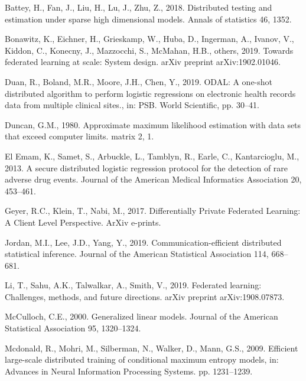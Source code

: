 \documentclass[]{elsarticle} %
\newlength{\cslhangindent}
\newenvironment{cslreferences}%
  {\setlength{\parindent}{0pt}%
  \everypar{\setlength{\hangindent}{\cslhangindent}}\ignorespaces}%
  {\par}
\begin{document}
\hypertarget{refs}{}
\begin{cslreferences}
\leavevmode\hypertarget{ref-battey2018distributed}{}%
Battey, H., Fan, J., Liu, H., Lu, J., Zhu, Z., 2018. Distributed testing
and estimation under sparse high dimensional models. Annals of
statistics 46, 1352.

\leavevmode\hypertarget{ref-bonawitz2019towards}{}%
Bonawitz, K., Eichner, H., Grieskamp, W., Huba, D., Ingerman, A.,
Ivanov, V., Kiddon, C., Konecny, J., Mazzocchi, S., McMahan, H.B.,
others, 2019. Towards federated learning at scale: System design. arXiv
preprint arXiv:1902.01046.

\leavevmode\hypertarget{ref-duan2019odal}{}%
Duan, R., Boland, M.R., Moore, J.H., Chen, Y., 2019. ODAL: A one-shot
distributed algorithm to perform logistic regressions on electronic
health records data from multiple clinical sites., in: PSB. World
Scientific, pp. 30--41.

\leavevmode\hypertarget{ref-duncan1980approximate}{}%
Duncan, G.M., 1980. Approximate maximum likelihood estimation with data
sets that exceed computer limits. matrix 2, 1.

\leavevmode\hypertarget{ref-spark}{}%
El Emam, K., Samet, S., Arbuckle, L., Tamblyn, R., Earle, C.,
Kantarcioglu, M., 2013. A secure distributed logistic regression
protocol for the detection of rare adverse drug events. Journal of the
American Medical Informatics Association 20, 453--461.

\leavevmode\hypertarget{ref-2017arXiv171207557G}{}%
Geyer, R.C., Klein, T., Nabi, M., 2017. Differentially Private Federated
Learning: A Client Level Perspective. ArXiv e-prints.

\leavevmode\hypertarget{ref-jordan2019communication}{}%
Jordan, M.I., Lee, J.D., Yang, Y., 2019. Communication-efficient
distributed statistical inference. Journal of the American Statistical
Association 114, 668--681.

\leavevmode\hypertarget{ref-li2019federated}{}%
Li, T., Sahu, A.K., Talwalkar, A., Smith, V., 2019. Federated learning:
Challenges, methods, and future directions. arXiv preprint
arXiv:1908.07873.

\leavevmode\hypertarget{ref-mcculloch2000generalized}{}%
McCulloch, C.E., 2000. Generalized linear models. Journal of the
American Statistical Association 95, 1320--1324.

\leavevmode\hypertarget{ref-mcdonald2009efficient}{}%
Mcdonald, R., Mohri, M., Silberman, N., Walker, D., Mann, G.S., 2009.
Efficient large-scale distributed training of conditional maximum
entropy models, in: Advances in Neural Information Processing Systems.
pp. 1231--1239.


\end{cslreferences}
\end{document}
